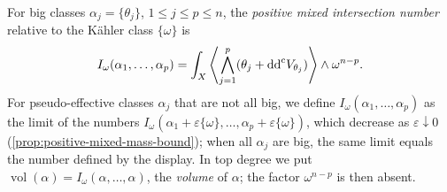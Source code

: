 \begin{definition}\label{def:positive-mixed-intersection-number}
For big classes $\alpha_j=\{\theta_j\}$, $1\leq j\leq p\leq n$, the \emph{positive mixed intersection number} relative to the K\"ahler class $\{\omega\}$ is
\[
 I_\omega(\alpha_1,\ldots,\alpha_p)
 =\int_X\left\langle\bigwedge_{j=1}^p
           (\theta_j+\mathrm{dd}^{\mathrm{c}} V_{\theta_j})\right\rangle\wedge\omega^{n-p}.
\]
For pseudo-effective classes $\alpha_j$ that are not all big, we define $I_\omega(\alpha_1,\ldots,\alpha_p)$ as the limit of the numbers $I_\omega(\alpha_1+\varepsilon\{\omega\},\ldots,\alpha_p+\varepsilon\{\omega\})$, which decrease as $\varepsilon\downarrow0$ (\cref{prop:positive-mixed-mass-bound}); when all $\alpha_j$ are big, the same limit equals the number defined by the display. In top degree we put $\operatorname{vol}(\alpha)=I_\omega(\alpha,\ldots,\alpha)$, the \emph{volume} of $\alpha$; the factor $\omega^{n-p}$ is then absent.
\end{definition}

